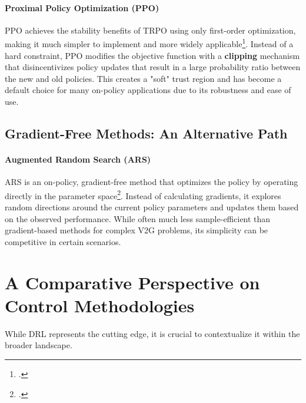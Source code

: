 \paragraph{Proximal Policy Optimization (PPO)}
PPO achieves the stability benefits of TRPO using only first-order optimization, making it much simpler to implement and more widely applicable\footcite{schulman2017proximal}. Instead of a hard constraint, PPO modifies the objective function with a \textbf{clipping} mechanism that disincentivizes policy updates that result in a large probability ratio between the new and old policies. This creates a "soft" trust region and has become a default choice for many on-policy applications due to its robustness and ease of use.

\subsection{Gradient-Free Methods: An Alternative Path}
\paragraph{Augmented Random Search (ARS)}
ARS is an on-policy, gradient-free method that optimizes the policy by operating directly in the parameter space\footcite{mania2018simple}. Instead of calculating gradients, it explores random directions around the current policy parameters and updates them based on the observed performance. While often much less sample-efficient than gradient-based methods for complex V2G problems, its simplicity can be competitive in certain scenarios.


\section{A Comparative Perspective on Control Methodologies}
While DRL represents the cutting edge, it is crucial to contextualize it within the broader landscape.

